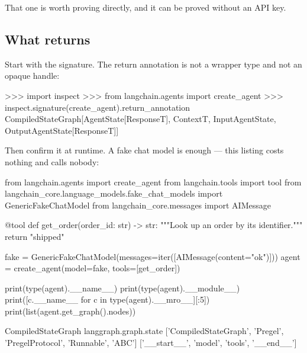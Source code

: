 That one is worth proving directly, and it can be proved without an API key.


\subsection{What \texorpdfstring{}{create\_agent} returns}
\label{sec:what-create-agent-returns}

Start with the signature. The return annotation is not a wrapper type and not an
opaque handle:

\begin{python}[caption={The declared return type of \api{create\_agent}}, label={lst:sig}]
>>> import inspect
>>> from langchain.agents import create_agent
>>> inspect.signature(create_agent).return_annotation
CompiledStateGraph[AgentState[ResponseT], ContextT, InputAgentState,
                   OutputAgentState[ResponseT]]
\end{python}

Then confirm it at runtime. A fake chat model is enough --- this listing costs
nothing and calls nobody:

\begin{python}[caption={An agent is a graph. Run this; it needs no provider.}, label={lst:inversion}]
from langchain.agents import create_agent
from langchain.tools import tool
from langchain_core.language_models.fake_chat_models import GenericFakeChatModel
from langchain_core.messages import AIMessage


@tool
def get_order(order_id: str) -> str:
    """Look up an order by its identifier."""
    return "shipped"


fake = GenericFakeChatModel(messages=iter([AIMessage(content="ok")]))
agent = create_agent(model=fake, tools=[get_order])

print(type(agent).__name__)
print(type(agent).__module__)
print([c.__name__ for c in type(agent).__mro__][:5])
print(list(agent.get_graph().nodes))
\end{python}

\begin{console}
CompiledStateGraph
langgraph.graph.state
['CompiledStateGraph', 'Pregel', 'PregelProtocol', 'Runnable', 'ABC']
['__start__', 'model', 'tools', '__end__']
\end{console}

